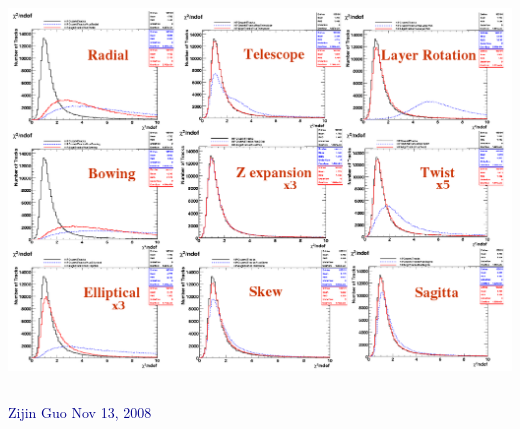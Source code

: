 \documentclass[compress]{beamer}
\begin{document}
\begin{frame}
\begin{columns}
\includegraphics[width=\linewidth]{chi2_sensitivity.png}
\end{columns}

\hfill \textcolor{darkblue}{\scriptsize Zijin Guo Nov 13, 2008}
\end{frame}
\end{document}
